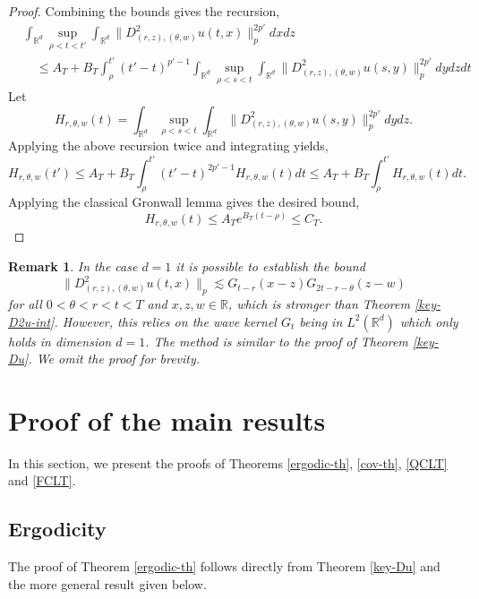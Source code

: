 \documentclass[12pt]{article}
\newtheorem{remark}[theorem]{Remark}
\def\bR{\mathbb{R}}
\newcommand{\les}{\lesssim}
\begin{document}
\begin{proof}
Combining the bounds gives the recursion, 
\begin{align*}
 & \int_{\bR^d} \sup_{\rho < t < t'} \int_{\bR^d} \|D^2_{(r,z),(\theta,w)}u(t,x)\|_{p}^{2p'} dx dz \\
 & \quad \leq A_T + B_T\int_\rho^{t'} (t'-t)^{p'-1} \int_{\bR^d} \sup_{\rho<s<t} \int_{\bR^d}  \|D^2_{(r,z),(\theta,w)}u(s,y)\|^{2p'}_{p} dy dz dt
\end{align*}
Let 
\[
 H_{r,\theta,w}(t) = \int_{\bR^d} \sup_{\rho<s<t} \int_{\bR^d}  \|D^2_{(r,z),(\theta,w)}u(s,y)\|^{2p'}_{p} dy dz.  
\]
Applying the above recursion twice and integrating yields, 
\[
H_{r,\theta,w}(t') \leq A_T + B_T \int_\rho^{t'} (t'-t)^{2p'-1} H_{r,\theta,w}(t)dt \leq   A_T + B_T \int_\rho^{t'} H_{r,\theta,w}(t)dt. 
\]
Applying the classical Gronwall lemma gives the desired bound, 
\[
 H_{r,\theta,w}(t) \leq A_Te^{B_T(t-\rho)} \leq C_T.
\]
\end{proof}

\begin{remark}
In the case $d = 1$ it is possible to establish the bound 
\[
 \|D^2_{(r,z),(\theta,w)} u(t,x)\|_p \les G_{t-r}(x-z)G_{2t-r-\theta}(z-w)
\]
 for all $0<\theta<r<t<T$ and $x,z,w \in \bR$, which is stronger than Theorem \ref{key-D2u-int}. However, this relies on the wave kernel $G_t$ being in $L^2(\bR^d)$ which only holds in dimension $d = 1$. The method is similar to the proof of Theorem \ref{key-Du}. We omit the proof for brevity. 
\end{remark}



\section{Proof of the main results}

In this section, we present the proofs of Theorems \ref{ergodic-th}, \ref{cov-th}, \ref{QCLT} and \ref{FCLT}.

\subsection{Ergodicity}

The proof of Theorem \ref{ergodic-th} follows directly from Theorem \ref{key-Du} and the more general result given below.
\end{document}
